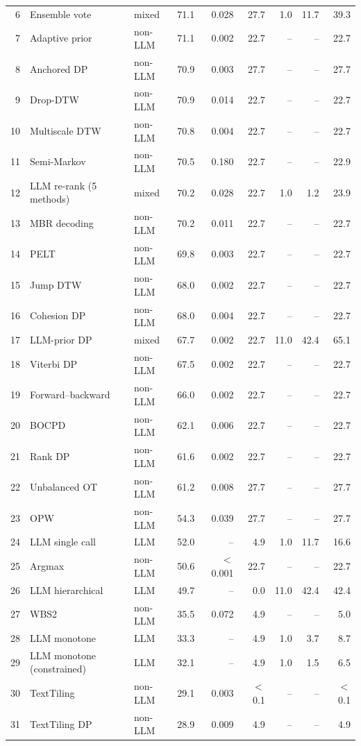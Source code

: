 \begin{table}[t]
\begin{tabular*}{\linewidth}{@{\extracolsep{\fill}}rllrrrrrr@{}}
6 & Ensemble vote & mixed & 71.1 & 0.028 & 27.7 & 1.0 & 11.7 & 39.3 \\
7 & Adaptive prior & non-LLM & 71.1 & 0.002 & 22.7 & -- & -- & 22.7 \\
8 & Anchored DP & non-LLM & 70.9 & 0.003 & 27.7 & -- & -- & 27.7 \\
9 & Drop-DTW & non-LLM & 70.9 & 0.014 & 22.7 & -- & -- & 22.7 \\
10 & Multiscale DTW & non-LLM & 70.8 & 0.004 & 22.7 & -- & -- & 22.7 \\
11 & Semi-Markov & non-LLM & 70.5 & 0.180 & 22.7 & -- & -- & 22.9 \\
12 & LLM re-rank (5 methods) & mixed & 70.2 & 0.028 & 22.7 & 1.0 & 1.2 & 23.9 \\
13 & MBR decoding & non-LLM & 70.2 & 0.011 & 22.7 & -- & -- & 22.7 \\
14 & PELT & non-LLM & 69.8 & 0.003 & 22.7 & -- & -- & 22.7 \\
15 & Jump DTW & non-LLM & 68.0 & 0.002 & 22.7 & -- & -- & 22.7 \\
16 & Cohesion DP & non-LLM & 68.0 & 0.004 & 22.7 & -- & -- & 22.7 \\
17 & LLM-prior DP & mixed & 67.7 & 0.002 & 22.7 & 11.0 & 42.4 & 65.1 \\
18 & Viterbi DP & non-LLM & 67.5 & 0.002 & 22.7 & -- & -- & 22.7 \\
19 & Forward--backward & non-LLM & 66.0 & 0.002 & 22.7 & -- & -- & 22.7 \\
20 & BOCPD & non-LLM & 62.1 & 0.006 & 22.7 & -- & -- & 22.7 \\
21 & Rank DP & non-LLM & 61.6 & 0.002 & 22.7 & -- & -- & 22.7 \\
22 & Unbalanced OT & non-LLM & 61.2 & 0.008 & 27.7 & -- & -- & 27.7 \\
23 & OPW & non-LLM & 54.3 & 0.039 & 27.7 & -- & -- & 27.7 \\
24 & LLM single call & LLM & 52.0 & -- & 4.9 & 1.0 & 11.7 & 16.6 \\
25 & Argmax & non-LLM & 50.6 & $<$0.001 & 22.7 & -- & -- & 22.7 \\
26 & LLM hierarchical & LLM & 49.7 & -- & 0.0 & 11.0 & 42.4 & 42.4 \\
27 & WBS2 & non-LLM & 35.5 & 0.072 & 4.9 & -- & -- & 5.0 \\
28 & LLM monotone & LLM & 33.3 & -- & 4.9 & 1.0 & 3.7 & 8.7 \\
29 & LLM monotone (constrained) & LLM & 32.1 & -- & 4.9 & 1.0 & 1.5 & 6.5 \\
30 & TextTiling & non-LLM & 29.1 & 0.003 & $<$0.1 & -- & -- & $<$0.1 \\
31 & TextTiling DP & non-LLM & 28.9 & 0.009 & 4.9 & -- & -- & 4.9 \\
\bottomrule
\end{tabular*}
\end{table}
